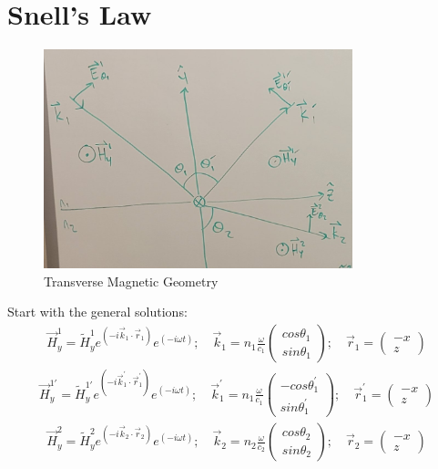 \documentclass{article}
\begin{document}
\section{Snell's Law}
\begin{figure}[ht!]
    \centering
    \includegraphics[width=0.8\textwidth]{TMG.jpg}
    \caption{Transverse Magnetic Geometry}
    \label{fig:my_label}
\end{figure}
Start with the general solutions:
\begin{align}
\vec{H}_{y}^{1} = \tilde{H}_{y}^{1} e^{\left( -i \vec{k}_{1} \cdot \vec{r}_{1} \right)} e^ {\left(-i \omega t \right)}; \quad 
\vec{k}_{1} = n_{1} \frac{\omega}{c_{1}} 
\begin{pmatrix}
	cos{\theta_{1}} \\
	sin{\theta_{1}}
\end{pmatrix}; \quad
\vec{r}_{1} = 
\begin{pmatrix}
	-x \\
	z
\end{pmatrix}
\end{align}
\begin{align}
\vec{H}_{y}^{1'} = \tilde{H}_{y}^{1'} e^{\left( -i \vec{k}_{1}^{'} \cdot \vec{r}_{1}^{'} \right)} e^ {\left(-i \omega t \right)}; \quad 
\vec{k}_{1}^{'} = n_{1} \frac{\omega}{c_{1}} 
\begin{pmatrix}
	-cos{\theta_{1}^{'}}\\
	sin{\theta_{1}^{'}}
\end{pmatrix}; \quad
\vec{r}_{1}^{'} = 
\begin{pmatrix}
	-x \\
	z
\end{pmatrix}
\end{align}
\begin{align}
\vec{H}_{y}^{2} = \tilde{H}_{y}^{2} e^{\left( -i \vec{k}_{2} \cdot \vec{r}_{2} \right)} e^ {\left(-i \omega t \right)}; \quad 
\vec{k}_{2} = n_{2} \frac{\omega}{c_{2}} 
\begin{pmatrix}
	cos{\theta_{2}} \\
	sin{\theta_{2}}
\end{pmatrix}; \quad
\vec{r}_{2} = 
\begin{pmatrix}
	-x \\
	z
\end{pmatrix}
\end{align}
\end{document}
